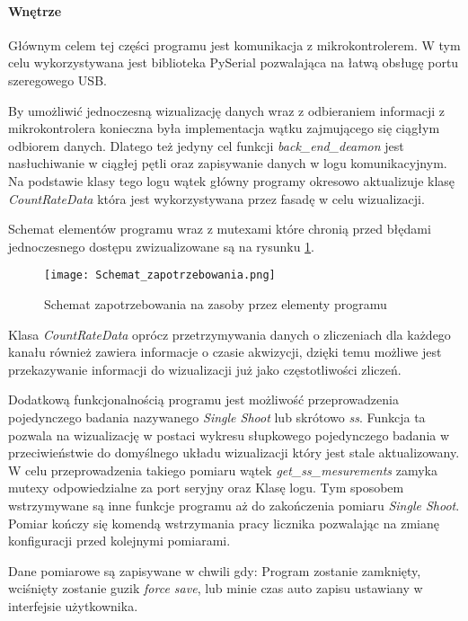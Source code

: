 \paragraph{Wnętrze}

Głównym celem tej części programu jest komunikacja z mikrokontrolerem. 
W tym celu wykorzystywana jest biblioteka PySerial\cite{pyserial} pozwalająca na łatwą obsługę portu szeregowego USB. 

By umożliwić jednoczesną wizualizację danych wraz z odbieraniem informacji z mikrokontrolera konieczna była implementacja wątku zajmującego się ciągłym odbiorem danych. 
Dlatego też jedyny cel funkcji \textit{back\_end\_deamon} jest nasłuchiwanie w ciągłej pętli oraz zapisywanie danych w logu komunikacyjnym. 
Na podstawie klasy tego logu wątek główny programy okresowo aktualizuje klasę \textit{CountRateData} która jest wykorzystywana przez fasadę w celu wizualizacji. 

Schemat elementów programu wraz z mutexami które chronią przed błędami jednoczesnego dostępu zwizualizowane są na rysunku \ref{program zapotrzebowanie}.

\begin{figure}
        \centering
        \texttt{[image: Schemat\_zapotrzebowania.png]}
        \caption{Schemat zapotrzebowania na zasoby przez elementy programu}
        \label{program zapotrzebowanie}
\end{figure}

Klasa \textit{CountRateData} oprócz przetrzymywania danych o zliczeniach dla każdego kanału również zawiera informacje o czasie akwizycji, dzięki temu możliwe jest przekazywanie informacji do wizualizacji już jako częstotliwości zliczeń. 

Dodatkową funkcjonalnością programu jest możliwość przeprowadzenia pojedynczego badania nazywanego \textit{Single Shoot} lub skrótowo \textit{ss}.
Funkcja ta pozwala na wizualizację w postaci wykresu słupkowego pojedynczego badania w przeciwieństwie do domyślnego układu wizualizacji który jest stale aktualizowany. 
W celu przeprowadzenia takiego pomiaru wątek \textit{get\_ss\_mesurements} zamyka mutexy odpowiedzialne za port seryjny oraz Klasę logu. 
Tym sposobem wstrzymywane są inne funkcje programu aż do zakończenia pomiaru \textit{Single Shoot}.
Pomiar kończy się komendą wstrzymania pracy licznika pozwalając na zmianę konfiguracji przed kolejnymi pomiarami.  

Dane pomiarowe są zapisywane w chwili gdy: Program zostanie zamknięty, wciśnięty zostanie guzik \textit{force save}, lub minie czas auto zapisu ustawiany w interfejsie użytkownika. 

